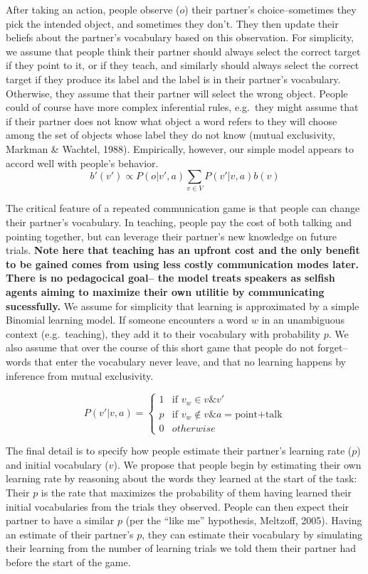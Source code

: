 \documentclass[10pt, letterpaper]{article}
\begin{document}
After taking an action, people observe (\(o\)) their partner's
choice--sometimes they pick the intended object, and sometimes they
don't. They then update their beliefs about the partner's vocabulary
based on this observation. For simplicity, we assume that people think
their partner should always select the correct target if they point to
it, or if they teach, and similarly should always select the correct
target if they produce its label and the label is in their partner's
vocabulary. Otherwise, they assume that their partner will select the
wrong object. People could of course have more complex inferential
rules, e.g.~they might assume that if their partner does not know what
object a word refers to they will choose among the set of objects whose
label they do not know (mutual exclusivity, Markman \& Wachtel, 1988).
Empirically, however, our simple model appears to accord well with
people's behavior. \[
b'(v') \propto P\left(o|v',a\right) \sum_{v \in V}P\left(v'|v,a\right)b\left(v\right)
\]

The critical feature of a repeated communication game is that people can
change their partner's vocabulary. In teaching, people pay the cost of
both talking and pointing together, but can leverage their partner's new
knowledge on future trials. \textbf{Note here that teaching has an
upfront cost and the only benefit to be gained comes from using less
costly communication modes later. There is no pedagocical goal-- the
model treats speakers as selfish agents aiming to maximize their own
utilitie by communicating sucessfully.} We assume for simplicity that
learning is approximated by a simple Binomial learning model. If someone
encounters a word \(w\) in an unambiguous context (e.g.~teaching), they
add it to their vocabulary with probability \(p\). We also assume that
over the course of this short game that people do not forget--words that
enter the vocabulary never leave, and that no learning happens by
inference from mutual exclusivity.

\[
P\left(v'|v,a\right)= \begin{cases} 
1 & \text{if } v_{w} \in v \& v'\\ 
p & \text{if } v_{w} \notin v \& a = \text{point+talk}\\ 
0 & otherwise\end{cases}
\]

The final detail is to specify how people estimate their partner's
learning rate (\(p\)) and initial vocabulary (\(v\)). We propose that
people begin by estimating their own learning rate by reasoning about
the words they learned at the start of the task: Their \(p\) is the rate
that maximizes the probability of them having learned their initial
vocabularies from the trials they observed. People can then expect their
partner to have a similar \(p\) (per the ``like me'' hypothesis,
Meltzoff, 2005). Having an estimate of their partner's \(p\), they can
estimate their vocabulary by simulating their learning from the number
of learning trials we told them their partner had before the start of
the game.
\end{document}
